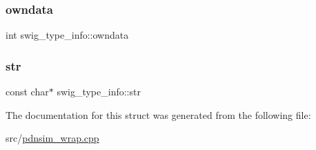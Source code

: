 \mbox{\label{structswig__type__info_a93c25d5903cbfcb82208eea7227c32bd}} 
\subsubsection{\texorpdfstring{owndata}{owndata}}
{\footnotesize\ttfamily int swig\+\_\+type\+\_\+info\+::owndata}

\mbox{\label{structswig__type__info_abbe7cc58a083feb4329b748643324064}} 
\subsubsection{\texorpdfstring{str}{str}}
{\footnotesize\ttfamily const char$\ast$ swig\+\_\+type\+\_\+info\+::str}



The documentation for this struct was generated from the following file\+:\begin{DoxyCompactItemize}
\item 
src/\hyperlink{pdnsim__wrap_8cpp}{pdnsim\+\_\+wrap.\+cpp}\end{DoxyCompactItemize}
